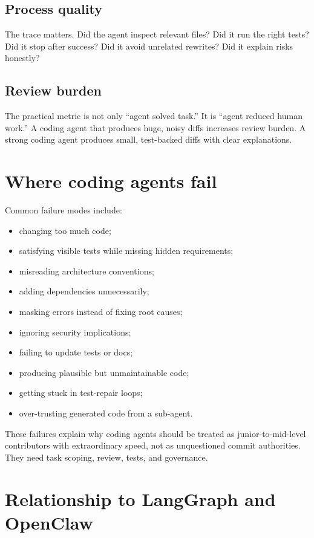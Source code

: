 \subsection{Process quality}

The trace matters. Did the agent inspect relevant files? Did it run the right tests? Did it stop after success? Did it avoid unrelated rewrites? Did it explain risks honestly?

\subsection{Review burden}

The practical metric is not only ``agent solved task.'' It is ``agent reduced human work.'' A coding agent that produces huge, noisy diffs increases review burden. A strong coding agent produces small, test-backed diffs with clear explanations.

\section{Where coding agents fail}

Common failure modes include:

\begin{itemize}[leftmargin=*]
  \item changing too much code;
  \item satisfying visible tests while missing hidden requirements;
  \item misreading architecture conventions;
  \item adding dependencies unnecessarily;
  \item masking errors instead of fixing root causes;
  \item ignoring security implications;
  \item failing to update tests or docs;
  \item producing plausible but unmaintainable code;
  \item getting stuck in test-repair loops;
  \item over-trusting generated code from a sub-agent.
\end{itemize}

These failures explain why coding agents should be treated as junior-to-mid-level contributors with extraordinary speed, not as unquestioned commit authorities. They need task scoping, review, tests, and governance.

\section{Relationship to LangGraph and OpenClaw}

